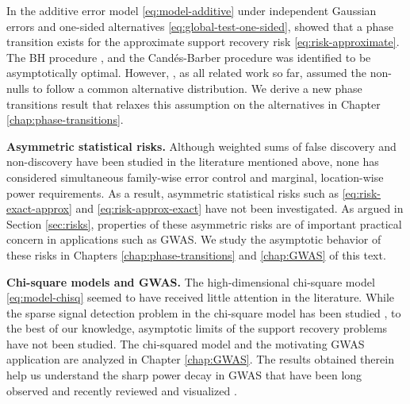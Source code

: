 In the additive error model \eqref{eq:model-additive} under independent Gaussian errors and one-sided alternatives \eqref{eq:global-test-one-sided},
\cite{arias2017distribution} showed that a phase transition exists for  the approximate support recovery risk \eqref{eq:risk-approximate}.
The \ac{BH} procedure \cite{benjamini1995controlling}, and the Cand\'es-Barber procedure \cite{barber2015controlling} was identified to be asymptotically optimal. %
However, \cite{arias2017distribution}, as all related work so far, assumed the non-nulls to follow a common alternative distribution.
We derive a new phase transitions result that relaxes this assumption on the alternatives in Chapter \ref{chap:phase-transitions}.

\medskip

{\bf Asymmetric statistical risks.}
Although weighted sums of false discovery and non-discovery have been studied in the literature mentioned above, none has considered simultaneous family-wise error control and marginal, location-wise power requirements.
As a result, asymmetric statistical risks such as \eqref{eq:risk-exact-approx} and \eqref{eq:risk-approx-exact} have not been investigated.
As argued in Section \ref{sec:risks}, properties of these asymmetric risks are of important practical concern in applications such as GWAS.
We study the asymptotic behavior of these risks in Chapters \ref{chap:phase-transitions} and \ref{chap:GWAS} of this text.

\medskip

{\bf Chi-square models and GWAS.}
The high-dimensional chi-square model \eqref{eq:model-chisq} seemed to have received little attention in the literature.
While the sparse signal detection problem in the chi-square model has been studied \cite{donoho2004higher}, to the best of our knowledge,  asymptotic limits of the support recovery problems have not been studied.
The chi-squared model and the motivating GWAS application are analyzed in Chapter \ref{chap:GWAS}.
The results obtained therein help us understand the sharp power decay in GWAS that have been long observed \citep{bush2012genome} and recently reviewed and visualized \citep{gao2019upass}.

